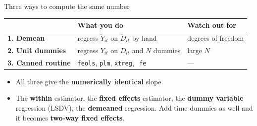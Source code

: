 \documentclass[
  11pt,
  ignorenonframetext,
  aspectratio=169,
]{beamer}
\providecommand{\tightlist}{%
  \setlength{\itemsep}{0pt}\setlength{\parskip}{0pt}}
\begin{document}
\begin{frame}{Three ways to compute the same number}
\protect{}\label{three-ways-to-compute-the-same-number}
\begin{center}\small
\begin{tabular}{lll}
\toprule
 & What you do & Watch out for \\
\midrule
\textbf{1. Demean} & regress $\ddot Y_{it}$ on $\ddot D_{it}$ by hand & degrees of freedom \\
\textbf{2. Unit dummies} & regress $Y_{it}$ on $D_{it}$ and $N$ dummies & large $N$  \\
\textbf{3. Canned routine} & \texttt{feols}, \texttt{plm}, \texttt{xtreg, fe} & --- \\
\bottomrule
\end{tabular}
\end{center}

\begin{itemize}
\tightlist
\item
  All three give the \textbf{numerically identical} slope.
\item
  The \textbf{within} estimator, the \textbf{fixed effects} estimator,
  the \textbf{dummy variable} regression (LSDV), the \textbf{demeaned}
  regression. Add time dummies as well and it becomes \textbf{two-way
  fixed effects}.
\end{itemize}
\end{frame}
\end{document}
